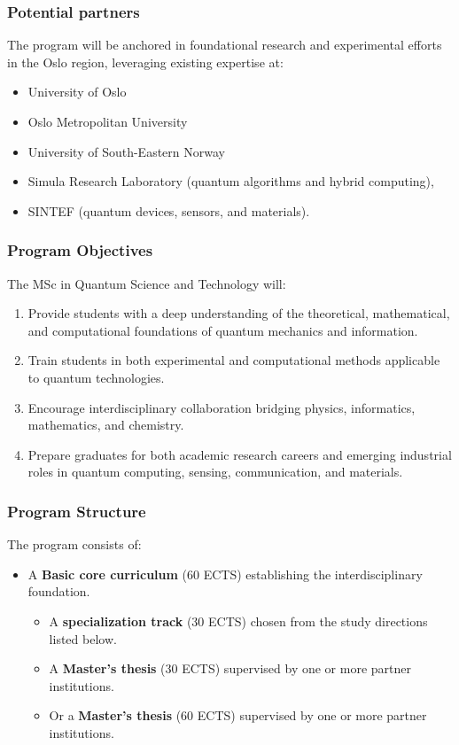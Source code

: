 \documentclass{beamer}
\begin{document}
\begin{frame}
\frametitle{Potential partners}
The program will be anchored in foundational research and experimental efforts in the Oslo region, leveraging existing expertise at:
\begin{itemize}
    \item University of Oslo 
    \item Oslo Metropolitan University
    \item University of South-Eastern Norway
    \item Simula Research Laboratory  (quantum algorithms and hybrid computing),
    \item SINTEF (quantum devices, sensors, and materials).
\end{itemize}


\end{frame}


\begin{frame}
\frametitle{Program Objectives}
The MSc in Quantum Science and Technology will:
\begin{enumerate}
    \item Provide students with a deep understanding of the theoretical, mathematical, and computational foundations of quantum mechanics and information.
    \item Train students in both experimental and computational methods applicable to quantum technologies.
    \item Encourage interdisciplinary collaboration bridging physics, informatics, mathematics, and chemistry.
    \item Prepare graduates for both academic research careers and emerging industrial roles in quantum computing, sensing, communication, and materials.
\end{enumerate}

\end{frame}


\begin{frame}
\frametitle{Program Structure}
The program consists of:
\begin{itemize}
\item A \textbf{Basic core curriculum} (60 ECTS) establishing the interdisciplinary foundation.
  \begin{itemize}
    \item A \textbf{specialization track} (30 ECTS) chosen from the study directions listed below.
    \item A \textbf{Master’s thesis} (30 ECTS) supervised by one or more partner institutions.
    \item Or a  \textbf{Master’s thesis} (60 ECTS) supervised by one or more partner institutions.      \end{itemize}
\end{itemize}

\end{frame}
\end{document}
